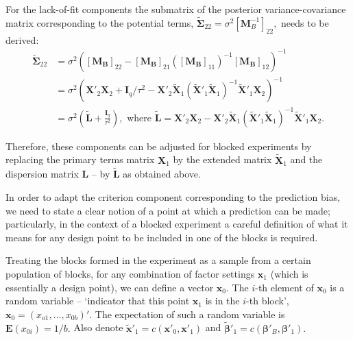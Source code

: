 For the lack-of-fit components the submatrix of the posterior variance-covariance matrix corresponding to the potential terms, $\bm{\tilde{\Sigma}}_{22}=\sigma^2[\bm{M}^{-1}_B]_{22},$ needs to be derived: 
\begin{align*}
\bm{\tilde{\Sigma}}_{22}&=\sigma^2([\bm{M_B}]_{22}-[\bm{M_B}]_{21}([\bm{M_B}]_{11})^{-1}[\bm{M_B}]_{12})^{-1}\\
&=\sigma^2(\bm{X}'_{2}\bm{X}_{2}+\bm{I}_{q}/\tau^2-\bm{X}'_{2}\bm{\tilde{X}}_{1}(\bm{\tilde{X}}'_{1}\bm{\tilde{X}}_{1})^{-1}\bm{\tilde{X}}'_{1}\bm{X}_{2})^{-1}\\&=\sigma^2\left(\bm{\tilde{L}}+\frac{\bm{I}_{q}}{\tau^2}\right), \mbox{ where }\bm{\tilde{L}}=\bm{X}'_{2}\bm{X}_{2}-\bm{X}'_{2}\bm{\tilde{X}}_{1}(\bm{\tilde{X}}'_{1}\bm{\tilde{X}}_{1})^{-1}\bm{\tilde{X}}'_{1}\bm{X}_{2}.
\end{align*}

Therefore, these components can be adjusted for blocked experiments by replacing the primary terms matrix $\bm{X}_{1}$ by the extended matrix $\bm{\tilde{X}}_{1}$ and the dispersion matrix $\bm{L}$ -- by $\bm{\tilde{L}}$ as obtained above. 

In order to adapt the criterion component corresponding to the prediction bias, we need to state a clear notion of a point at which a prediction can be made; particularly, in the context of a blocked experiment a careful definition of what it means for any design point to be included in one of the blocks is required. 

Treating the blocks formed in the experiment as a sample from a certain population of blocks, for any combination of factor settings $\bm{x}_1$ (which is essentially a design point), we can define a vector $\bm{x}_0$. The $i$-th element of $\bm{x}_0$ is a random variable -- `indicator that this point $\bm{x}_1$ is in the $i$-th block', $\bm{x}_0=(x_{o1},...,x_{0b})'$. The expectation of such a random variable is $\textbf{E}(x_{0i})=1/b.$ Also denote $\tilde{\bm{x}}'_{1}=c(\bm{x}'_0,\bm{x}'_1)$ and $\tilde{\bm{\beta}}'_{1}=c(\bm{\beta}'_B,\bm{\beta}'_1).$

